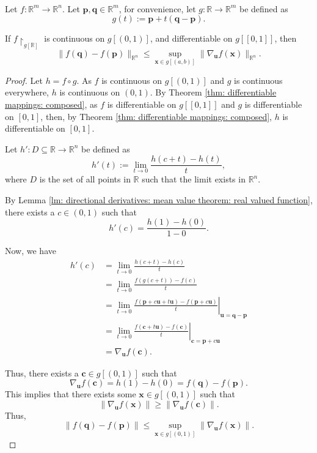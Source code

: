 \begin{theorem}
	\label{thm: directional derivatives: mean value theorem: vector valued function}\
	
	Let $f: \mathbb R^m \to \mathbb R^n$. Let $\mathbf p, \mathbf q \in \mathbb R^m$, for convenience, let $g: \mathbb R \to \mathbb R^m$ be defined as
	$$
	g(t) := \mathbf p + t(\mathbf q - \mathbf p).
	$$
	
	If $f \restriction_{g[\mathbb R]}$ is continuous on $g[(0,1)]$, and differentiable on $g[[0,1]]$, then
	$$
	\| f(\mathbf q) - f(\mathbf p) \|_{\mathbb R^n} \le \sup_{\mathbf x \in g[(a,b)]} \| \nabla_{\mathbf u} f(\mathbf x) \|_{\mathbb R^n}.
	$$
	
	\begin{proof}Let $h = f \circ g$. As $f$ is continuous on $g[(0,1)]$ and $g$ is continuous everywhere, $h$ is continuous on $(0,1)$. By Theorem \ref{thm: differentiable mappings: composed}, as $f$ is differentiable on $g[[0,1]]$ and $g$ is differentiable on $[0,1]$, then, by Theorem \ref{thm: differentiable mappings: composed}, $h$ is differentiable on $[0,1]$.
	
		Let $h': D \subseteq \mathbb R \to \mathbb R^n$ be defined as
		$$
		h'(t) := \lim_{t \to 0} \frac{h(c + t) - h(t)}{t},
		$$
		where $D$ is the set of all points in $\mathbb R$ such that the limit exists in $\mathbb R^n$.
		
		By Lemma \ref{lm: directional derivatives: mean value theorem: real valued function}, there exists a $c \in (0,1)$ such that
		$$
		h'(c) = \frac{h(1) - h(0)}{1 - 0}.
		$$
		
		Now, we have
		$$
		\begin{aligned}
		h'(c) &= \lim_{t \to 0} \frac{h(c + t) - h(c)}{t} \\
		&= \lim_{t \to 0} \frac{f(g(c + t)) - f(c)}{t} \\
		&= \left.\lim_{t \to 0} \frac{f(\mathbf p + c\mathbf u + t\mathbf u) - f(\mathbf p + c\mathbf u)}{t}\right|_{\mathbf u = \mathbf q - \mathbf p} \\
		&= \left. \lim_{t \to 0} \frac{f(\mathbf c + t\mathbf u) - f(\mathbf c)}{t} \right|_{\mathbf c = \mathbf p + c \mathbf u} \\
		&= \nabla_{\mathbf u}f(\mathbf c).
		\end{aligned}	
		$$
		
		Thus, there exists a $\mathbf c \in g[(0,1)]$ such that
		$$
		\nabla_{\mathbf u} f(\mathbf c) = h(1) - h(0) =f(\mathbf q) - f(\mathbf p).
		$$
		This implies that there exists some $\mathbf x \in g[(0,1)]$ such that
		$$
		\| \nabla_{\mathbf u}f(\mathbf x) \| \ge \| \nabla_{\mathbf u}f(\mathbf c) \|.
		$$
		Thus,
		$$
		\| f(\mathbf q) - f(\mathbf p) \| \le \sup_{\mathbf x \in g[(0,1)]}\| \nabla_{\mathbf u} f(\mathbf x) \|.
		$$
	\end{proof}
\end{theorem}


